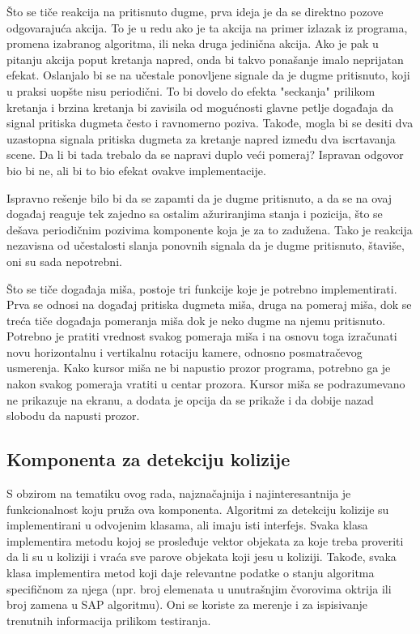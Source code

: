 \documentclass[12pt,oneside]{memoir}
\begin{document}
Što se tiče reakcija na pritisnuto dugme, prva ideja je da se direktno pozove odgovarajuća akcija. 
To je u redu ako je ta akcija na primer izlazak iz programa, promena izabranog algoritma, ili neka druga jedinična akcija.
Ako je pak u pitanju akcija poput kretanja napred, onda bi takvo ponašanje imalo neprijatan efekat. 
Oslanjalo bi se na učestale ponovljene signale da je dugme pritisnuto, koji u praksi uopšte nisu periodični.
To bi dovelo do efekta "seckanja" prilikom kretanja i brzina kretanja bi zavisila od mogućnosti glavne petlje događaja da signal pritiska dugmeta često i ravnomerno poziva.
Takođe, mogla bi se desiti  dva uzastopna signala pritiska dugmeta za kretanje napred između dva iscrtavanja scene. 
Da li bi tada trebalo da se napravi duplo veći pomeraj?
Ispravan odgovor bio bi ne, ali bi to bio efekat ovakve implementacije.

Ispravno rešenje bilo bi da se zapamti da je dugme pritisnuto,  a da se na ovaj događaj reaguje  tek zajedno sa ostalim ažuriranjima 
stanja i pozicija, što se dešava periodičnim pozivima komponente koja je za to zadužena. Tako je reakcija nezavisna od učestalosti 
slanja ponovnih signala da je dugme pritisnuto, štaviše, oni su sada nepotrebni. 

Što se tiče događaja miša, postoje tri funkcije koje je potrebno implementirati. Prva se odnosi na događaj pritiska 
dugmeta miša, druga na pomeraj miša, dok se treća tiče događaja pomeranja miša dok je neko dugme na njemu pritisnuto.
Potrebno je pratiti vrednost svakog pomeraja miša i na osnovu toga izračunati novu horizontalnu i vertikalnu rotaciju 
kamere, odnosno posmatračevog usmerenja.
Kako kursor miša ne bi napustio prozor programa, 
potrebno ga je nakon svakog pomeraja vratiti u centar prozora.
Kursor miša se podrazumevano ne prikazuje na ekranu, a dodata je opcija da se prikaže i da dobije nazad slobodu da napusti prozor.

\subsection{Komponenta za detekciju kolizije}

S obzirom na tematiku ovog rada, najznačajnija i najinteresantnija je funkcionalnost koju pruža ova komponenta.
Algoritmi za detekciju kolizije su implementirani u odvojenim klasama, ali imaju isti interfejs.
Svaka klasa implementira metodu kojoj se prosleđuje vektor objekata za koje treba proveriti da li su u koliziji
i vraća sve parove objekata koji jesu u koliziji. Takođe, svaka klasa implementira metod koji daje relevantne podatke 
o stanju algoritma specifičnom za njega (npr. broj elemenata u unutrašnjim čvorovima oktrija ili broj 
zamena u SAP algoritmu). Oni se koriste za merenje i za ispisivanje trenutnih informacija prilikom testiranja.
\end{document}
